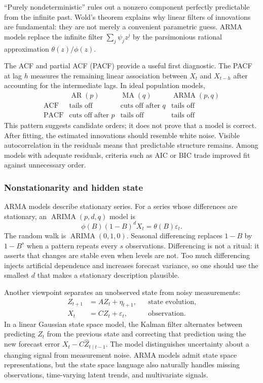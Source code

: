 ``Purely nondeterministic'' rules out a nonzero component perfectly predictable
from the infinite past. Wold's theorem explains why linear filters of innovations
are fundamental: they are not merely a convenient parametric guess. ARMA models
replace the infinite filter $\sum_j\psi_jz^j$ by the parsimonious rational
approximation $\theta(z)/\phi(z)$.

The ACF and partial ACF (PACF) provide a useful first diagnostic. The PACF at lag
$h$ measures the remaining linear association between $X_t$ and $X_{t-h}$ after
accounting for the intermediate lags. In ideal population models,
\[
\begin{array}{c|ccc}
 & \operatorname{AR}(p) & \operatorname{MA}(q) & \operatorname{ARMA}(p,q)\\
\hline
\text{ACF}  & \text{tails off} & \text{cuts off after }q & \text{tails off}\\
\text{PACF} & \text{cuts off after }p & \text{tails off} & \text{tails off}
\end{array}
\]
This pattern suggests candidate orders; it does not prove that a model is
correct. After fitting, the estimated innovations should resemble white noise.
Visible autocorrelation in the residuals means that predictable structure remains.
Among models with adequate residuals, criteria such as AIC or BIC trade improved
fit against unnecessary order.

\subsubsection{Nonstationarity and hidden state}
ARMA models describe stationary series. For a series whose differences are
stationary, an $\operatorname{ARIMA}(p,d,q)$ model is
\[
    \phi(B)(1-B)^dX_t=\theta(B)\varepsilon_t.
\]
The random walk is $\operatorname{ARIMA}(0,1,0)$. Seasonal differencing replaces
$1-B$ by $1-B^s$ when a pattern repeats every $s$ observations. Differencing is
not a ritual: it asserts that changes are stable even when levels are not. Too
much differencing injects artificial dependence and increases forecast variance,
so one should use the smallest $d$ that makes a stationary description plausible.

Another viewpoint separates an unobserved state from noisy measurements:
\[
\begin{aligned}
    Z_{t+1}&=AZ_t+\eta_{t+1}, &&\text{state evolution},\\
    X_t&=CZ_t+\varepsilon_t, &&\text{observation}.
\end{aligned}
\]
In a linear Gaussian state space model, the Kalman filter alternates between
predicting $Z_t$ from the previous state and correcting that prediction using the
new forecast error $X_t-C\widehat{Z}_{t\mid t-1}$. The model distinguishes
uncertainty about a changing signal from measurement noise. ARMA models admit
state space representations, but the state space language also naturally handles
missing observations, time-varying latent trends, and multivariate signals.

